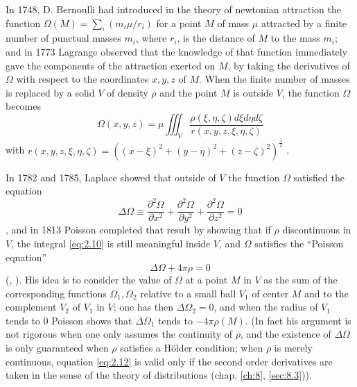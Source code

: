 \documentclass[12pt,a4paper,leqno,twoside]{extbook}
\begin{document}
In 1748, D. Bernoulli had introduced in the theory of newtonian attraction the function \(\Omega(M) = \sum\limits_i\left(m_i \mu/r_i\right)\) for a point \(M\) of mass \(\mu\) attracted by a finite number of punctual masses \(m_i\), where \(r_i\), is the distance of \(M\) to the mass \(m_i\); and in 1773 Lagrange observed that the knowledge of that function immediately gave the components of the attraction exerted on \(M\), by taking the derivatives of \(\Omega\) with respect to the coordinates \(x, y, z\) of \(M\). When the finite number of masses is replaced by a solid \(V\) of density \(\rho\) and the point \(M\) is outside \(V\), the function \(\Omega\) becomes
\begin{equation}
    \label{eq:2.10}
    \Omega(x,y,z) = \mu \iiint_V \frac{\rho(\xi, \eta, \zeta) d\xi d\eta d\zeta}{r(x, y, z, \xi, \eta, \zeta)}
\end{equation}
with \(r(x, y, z, \xi, \eta, \zeta) = \left( (x-\xi)^2 + (y-\eta)^2 + (z-\zeta)^2 \right)^{\frac{1}{2}}\) \cite[vol.~VI, p.~349]{135}.

In 1782 and 1785, Laplace showed that outside of \(V\) the function \(\Omega\) satisfied the equation
\begin{equation}
    \label{eq:2.11}
    \Delta \Omega \equiv \frac{\partial^2 \Omega}{\partial x^2} + \frac{\partial^2 \Omega}{\partial y^2} + \frac{\partial^2 \Omega}{\partial z^2} = 0
\end{equation}
\cite[vol.~X, p.~361--363 and vol.~XI, p.~276--280]{137}, and in 1813 Poisson completed that result by showing that if \(\rho\) discontinuous in \(V\), the integral \eqref{eq:2.10} is still meaningful inside \(V\), and \(\Omega\) satisfies the ``Poisson equation''
\begin{equation}
    \label{eq:2.12}
    \Delta\Omega + 4\pi \rho = 0
\end{equation}
(\cite{178}, \cite[p.~342--346]{S}). His idea is to consider the value of \(\Omega\) at a point \(M\) in \(V\) as the sum of the corresponding functions \(\Omega_1, \Omega_2\) relative to a small ball \(V_1\) of center \(M\) and to the complement \(V_2\) of \(V_1\) in \(V\); one has then \(\Delta\Omega_2 = 0\), and when the radius of \(V_1\) tends to 0 Poisson shows that \(\Delta\Omega_1\) tends to \(-4\pi\rho(M)\). (In fact his argument is not rigorous when one only assumes the continuity of \(\rho\), and the existence of \(\Delta\Omega\) is only guaranteed when \(\rho\) satisfies a Hölder condition; when \(\rho\) is merely continuous, equation \eqref{eq:2.12} is valid only if the second order derivatives are taken in the sense of the theory of distributions (chap. \ref{ch:8}, \ref{sec:8.3})).
\end{document}
